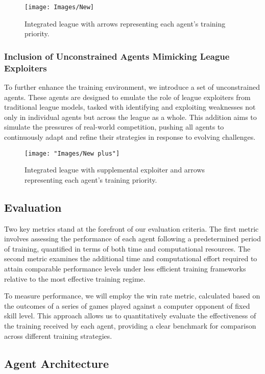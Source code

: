 \documentclass[journal]{IEEEtran}
\begin{document}
\begin{figure}
	\centering
	\texttt{[image: Images/New]}
	\caption{Integrated league with arrows representing each agent's training priority.}
	\label{fig:new}
\end{figure}

	\subsubsection{Inclusion of Unconstrained Agents Mimicking League Exploiters} 
	To further enhance the training environment, we introduce a set of unconstrained agents. 
	These agents are designed to emulate the role of league exploiters from traditional league models, 
	tasked with identifying and exploiting weaknesses not only in individual agents but across the league as a whole. 
	This addition aims to simulate the pressures of real-world competition, 
	pushing all agents to continuously adapt and refine their strategies in response to evolving challenges.
	
\begin{figure}
	\centering
	\texttt{[image: "Images/New plus"]}
	\caption{Integrated league with supplemental exploiter and arrows representing each agent's training priority.}
	\label{fig:new-plus}
\end{figure}
	
	\subsection{Evaluation}
	
	Two key metrics stand at the forefront of our evaluation criteria. The first metric involves assessing the performance of each agent following a predetermined period of training, quantified in terms of both time and computational resources. The second metric examines the additional time and computational effort required to attain comparable performance levels under less efficient training frameworks relative to the most effective training regime.
	
	To measure performance, we will employ the win rate metric, calculated based on the outcomes of a series of games played against a computer opponent of fixed skill level. This approach allows us to quantitatively evaluate the effectiveness of the training received by each agent, providing a clear benchmark for comparison across different training strategies.
	
	\subsection{Agent Architecture}
	
\end{document}

